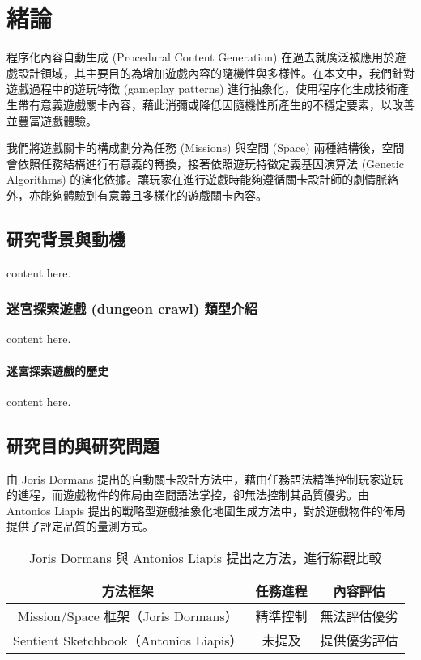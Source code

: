 \chapter{緒論}
\label{cha:intro}

程序化內容自動生成 (Procedural Content Generation) 在過去就廣泛被應用於遊戲設計領域，其主要目的為增加遊戲內容的隨機性與多樣性。在本文中，我們針對遊戲過程中的遊玩特徵 (gameplay patterns) 進行抽象化，使用程序化生成技術產生帶有意義遊戲關卡內容，藉此消彌或降低因隨機性所產生的不穩定要素，以改善並豐富遊戲體驗。

我們將遊戲關卡的構成劃分為任務 (Missions) 與空間 (Space) 兩種結構後，空間會依照任務結構進行有意義的轉換，接著依照遊玩特徵定義基因演算法 (Genetic Algorithms) 的演化依據。讓玩家在進行遊戲時能夠遵循關卡設計師的劇情脈絡外，亦能夠體驗到有意義且多樣化的遊戲關卡內容。

\section{研究背景與動機}

content here.

\subsection{迷宮探索遊戲 (dungeon crawl) 類型介紹}

content here.

\subsubsection{迷宮探索遊戲的歷史}

content here.


\section{研究目的與研究問題}

由 Joris Dormans 提出的自動關卡設計方法中，藉由任務語法精準控制玩家遊玩的進程，而遊戲物件的佈局由空間語法掌控，卻無法控制其品質優劣。由 Antonios Liapis 提出的戰略型遊戲抽象化地圖生成方法中，對於遊戲物件的佈局提供了評定品質的量測方式。

\begin{table}[!htb]
  \centering
  \caption{Joris Dormans 與 Antonios Liapis 提出之方法，進行綜觀比較}
  \label{tbl:compare-the-method-form-jd-and-al}
  \bigskip
  \begin{tabular}{ | c | c | c | }
    \hline
    方法框架                               & 任務進程 & 內容評估     \\\hline
    Mission/Space 框架（Joris Dormans）    & 精準控制 & 無法評估優劣 \\\hline
    Sentient Sketchbook（Antonios Liapis） & 未提及   & 提供優劣評估 \\\hline
  \end{tabular}
\end{table}

